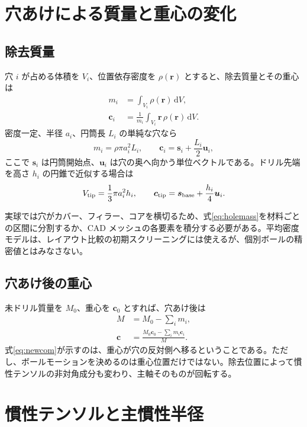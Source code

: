 \documentclass[11pt,a4paper]{article}
\newcommand{\vect}[1]{\bm{#1}}
\newcommand{\dd}{\,\mathrm{d}}
\begin{document}
\section{穴あけによる質量と重心の変化}

\subsection{除去質量}

穴 $i$ が占める体積を $V_i$、位置依存密度を $\rho(\vect r)$ とすると、除去質量とその重心は
\begin{align}
 m_i &= \int_{V_i}\rho(\vect r)\dd V,\\
 \vect c_i &= \frac{1}{m_i}\int_{V_i}\vect r\,\rho(\vect r)\dd V.
 \label{eq:holemass}
\end{align}
密度一定、半径 $a_i$、円筒長 $L_i$ の単純な穴なら
\begin{equation}
 m_i=\rho\pi a_i^2L_i,
 \qquad
 \vect c_i=\vect s_i+\frac{L_i}{2}\vect u_i,
\end{equation}
ここで $\vect s_i$ は円筒開始点、$\vect u_i$ は穴の奥へ向かう単位ベクトルである。ドリル先端を高さ $h_i$ の円錐で近似する場合は
\begin{equation}
 V_{\rm tip}=\frac{1}{3}\pi a_i^2h_i,
 \qquad
 \vect c_{\rm tip}=\vect s_{\rm base}+\frac{h_i}{4}\vect u_i.
\end{equation}

実球では穴がカバー、フィラー、コアを横切るため、式\eqref{eq:holemass}を材料ごとの区間に分割するか、CAD メッシュの各要素を積分する必要がある。平均密度モデルは、レイアウト比較の初期スクリーニングには使えるが、個別ボールの精密値とはみなさない。

\subsection{穴あけ後の重心}

未ドリル質量を $M_0$、重心を $\vect c_0$ とすれば、穴あけ後は
\begin{align}
 M &= M_0-\sum_i m_i,\\
 \vect c &=
 \frac{M_0\vect c_0-\sum_i m_i\vect c_i}{M}.
 \label{eq:newcom}
\end{align}
式\eqref{eq:newcom}が示すのは、重心が穴の反対側へ移るということである。ただし、ボールモーションを決めるのは重心位置だけではない。除去位置によって慣性テンソルの非対角成分も変わり、主軸そのものが回転する。

\section{慣性テンソルと主慣性半径}
\end{document}
